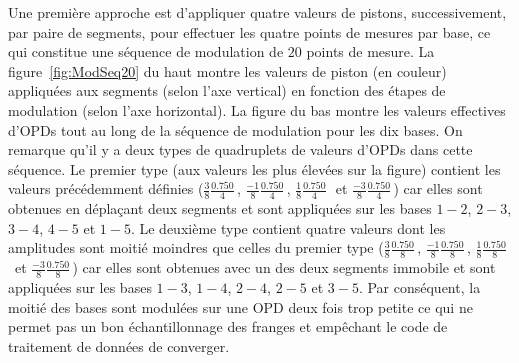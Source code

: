 Une première approche est d'appliquer quatre valeurs de pistons, successivement, par paire de segments, pour effectuer les quatre points de mesures par base, ce qui constitue une séquence de modulation de $20$ points de mesure. La figure~\ref{fig:ModSeq20} du haut montre les valeurs de piston (en couleur) appliquées aux segments (selon l'axe vertical) en fonction des étapes de modulation (selon l'axe horizontal). La figure du bas montre les valeurs effectives d'\ac{OPD}s tout au long de la séquence de modulation pour les dix bases. On remarque qu'il y a deux types de quadruplets de valeurs d'\ac{OPD}s dans cette séquence. Le premier type (aux valeurs les plus élevées sur la figure) contient les valeurs précédemment définies ($\frac{3}{8} \frac{0.750}{4} \,$\um, $\frac{-1}{8} \frac{0.750}{4} \,$\um, $\frac{1}{8} \frac{0.750}{4} \,$\um~et $\frac{-3}{8} \frac{0.750}{4} \,$\um) car elles sont obtenues en déplaçant deux segments et sont appliquées sur les bases $1-2$, $2-3$, $3-4$, $4-5$ et $1-5$. Le deuxième type contient quatre valeurs dont les amplitudes sont moitié moindres que celles du premier type ($\frac{3}{8} \frac{0.750}{8} \,$\um, $\frac{-1}{8} \frac{0.750}{8} \,$\um, $\frac{1}{8} \frac{0.750}{8} \,$\um~et $\frac{-3}{8} \frac{0.750}{8} \,$\um) car elles sont obtenues avec un des deux segments immobile et sont appliquées sur les bases $1-3$, $1-4$, $2-4$, $2-5$ et $3-5$. Par conséquent, la moitié des bases sont modulées sur une OPD deux fois trop petite ce qui ne permet pas un bon échantillonnage des franges et empêchant le code de traitement de données de converger.

